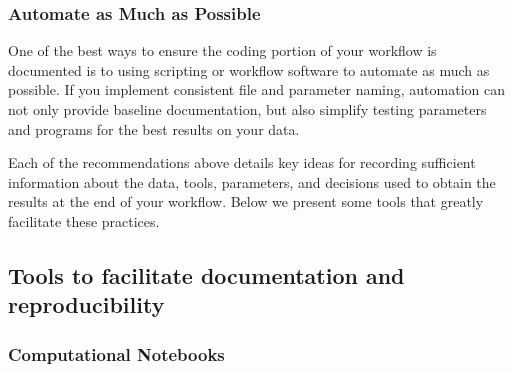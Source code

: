 \documentclass[10pt,letterpaper]{article}
\begin{document}

 \subsubsection*{Automate as Much as Possible} One of the best ways to ensure the coding portion of your workflow is documented is to using scripting or workflow software to automate as much as possible. If you implement consistent file and parameter naming, automation can not only provide baseline documentation, but also simplify testing parameters and programs for the best results on your data. 

 Each of the recommendations above details key ideas for recording sufficient information about the data, tools, parameters, and decisions used to obtain the results at the end of your workflow. Below we present some tools that greatly facilitate these practices.
 


\subsection*{Tools to facilitate documentation and reproducibility}

\subsubsection*{Computational Notebooks} 
\end{document}
